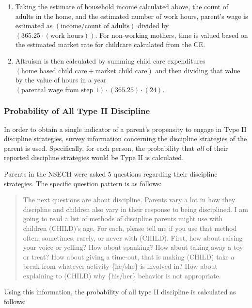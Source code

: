 \documentclass[]{elsarticle}
\begin{document}
\begin{enumerate}
\def\labelenumi{\arabic{enumi}.}
\item
  Taking the estimate of household income calculated above, the count of
  adults in the home, and the estimated number of work hours, parent's
  wage is estimated as $(\text{income}/\text{count of adults})$ divided
  by $(365.25\cdot(\text{work hours}))$. For non-working mothers, time
  is valued based on the estimated market rate for childcare calculated
  from the CE.
\item
  Altruism is then calculated by summing child care expenditures
  $(\text{home based child care} + \text{market child care})$ and then
  dividing that value by the value of hours in a year
  $(\text{parental wage from step 1})\cdot(365.25)\cdot(24)$.
\end{enumerate}

\subsubsection{Probability of All Type II
Discipline}\label{probability-of-all-type-ii-discipline}

In order to obtain a single indicator of a parent's propensity to engage
in Type II discipline strategies, survey information concerning the
discipline strategies of the parent is used. Specifically, for each
person, the probability that \emph{all} of their reported discipline
strategies would be Type II is calculated.

Parents in the NSECH were asked 5 questions regarding their discipline
strategies. The specific question pattern is as follows:

\begin{quote}
The next questions are about discipline. Parents vary a lot in how they
discipline and children also vary in their response to being
disciplined. I am going to read a list of methods of discipline parents
might use with children (CHILD)'s age. For each, please tell me if you
use that method often, sometimes, rarely, or never with (CHILD). First,
how about raising your voice or yelling? How about spanking? How about
taking away a toy or treat? How about giving a time-out, that is making
(CHILD) take a break from whatever activity \{he/she\} is involved in?
How about explaining to (CHILD) why \{his/her\} behavior is not
appropriate.
\end{quote}

Using this information, the probability of all type II discipline is
calculated as follows:
\end{document}
